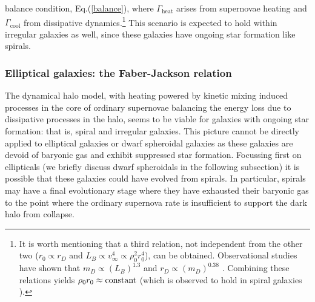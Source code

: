 \documentclass[12pt]{article}
\begin{document}
{{balance condition, Eq.(\ref{balance}), where $\Gamma _{\text{heat}}$
arises from supernovae heating and $\Gamma _{\text{cool}}$ from
dissipative dynamics.\footnote{It is worth mentioning that a third
relation, not independent from the other two ($r _0 \propto r _D$ and $L
_B \propto v _{\infty} ^4 \propto \rho _0 ^2r _0 ^4$), can be obtained.
Observational studies have shown that $m _D \propto \left ( L _B \right
) ^{1.3}$ \cite{shankar} and $r_D \propto \left ( m _D \right ) ^{0.38}$
\cite{saluccird}. Combining these relations yields $\rho _0 r _0 \approx
{\rm constant}$ (which is observed to hold in spiral galaxies
\cite{kormendy}).} This scenario is expected to hold within irregular
galaxies as well, since these galaxies have ongoing star formation like
spirals.

\subsubsection{Elliptical galaxies: the Faber-Jackson relation}

The dynamical halo model, with heating powered by kinetic mixing induced
processes in the core of ordinary supernovae 
balancing the energy loss due to dissipative processes in the halo,
seems to be
viable for galaxies with ongoing star formation: that is, spiral and
irregular galaxies. This picture cannot be directly applied to
elliptical galaxies 
or dwarf spheroidal galaxies
as these galaxies are devoid of baryonic gas and exhibit suppressed star
formation. 
Focussing first on ellipticals (we briefly discuss dwarf spheroidals in
the following subsection)
it is possible that these galaxies could have evolved from spirals. In
particular, spirals may have a final evolutionary stage where 
they have exhausted their baryonic gas to the point where the ordinary
supernova rate is insufficient to support the dark halo from collapse.

}}
\end{document}
